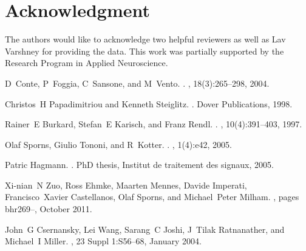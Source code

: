 \documentclass[11pt]{article}
\begin{document}
	



\section*{Acknowledgment}

The authors would like to acknowledge two helpful reviewers as well as Lav Varshney for providing the data. This work was partially supported by the Research Program in Applied Neuroscience. 





\begin{thebibliography}{10}

D~Conte, P~Foggia, C~Sansone, and M~Vento.
.
, 18(3):265--298, 2004.

Christos~H Papadimitriou and Kenneth Steiglitz.
.
\newblock Dover Publications, 1998.

Rainer~E Burkard, Stefan~E Karisch, and Franz Rendl.
.
, 10(4):391--403, 1997.

Olaf Sporns, Giulio Tononi, and R~Kotter.
.
, 1(4):e42, 2005.

Patric Hagmann.
.
\newblock PhD thesis, Institut de traitement des signaux, 2005.

Xi-nian~N Zuo, Ross Ehmke, Maarten Mennes, Davide Imperati, Francisco~Xavier
  Castellanos, Olaf Sporns, and Michael~Peter Milham.
, pages bhr269--,
  October 2011.

John~G Csernansky, Lei Wang, Sarang~C Joshi, J~Tilak Ratnanather, and Michael~I
  Miller.
, 23 Suppl 1:S56--68, January 2004.


\end{thebibliography}
\end{document}
